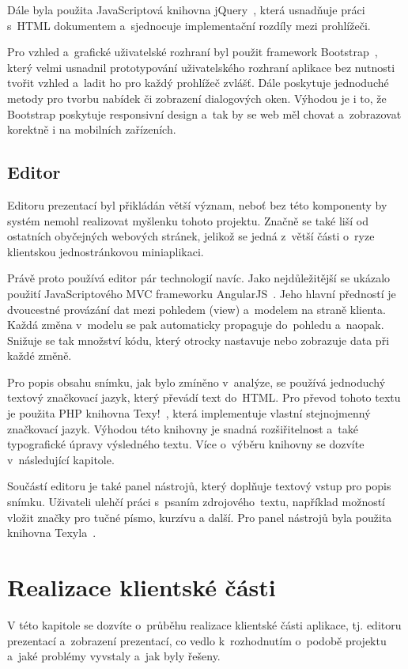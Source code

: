 \documentclass[11pt,twoside,a4paper]{book}
\newcommand*{\nom}[2]{#1\nomenclature{#1}{#2}} 			%
\begin{document}
Dále byla použita Java\-Scriptová knihovna jQuery~\cite{jQuery}, která usnadňuje práci s~HTML dokumentem a~sjednocuje imple\-mentační rozdíly mezi prohlížeči.

Pro vzhled a~grafické uživatelské rozhraní byl použit framework Bootstrap~\cite{bootstrap}, který velmi usnadnil prototypování uživatelského rozhraní aplikace bez nutnosti tvořit vzhled a~ladit ho pro každý prohlížeč zvlášť. Dále poskytuje jednoduché metody pro tvorbu nabídek či zobrazení dialogových oken. Výhodou je i to, že Bootstrap poskytuje responsivní design a~tak by se web měl chovat a~zobrazovat korektně i na mobilních zařízeních.


\section{Editor}
Editoru prezentací byl přikládán větší význam, neboť bez této komponenty by systém nemohl realizovat myšlenku tohoto projektu. Značně se také liší od ostatních obyčejných webových stránek, jelikož se jedná z~větší části o~ryze klientskou jednostránkovou mini\-aplikaci.

Právě proto používá editor pár technologií navíc. Jako nejdůležitější se ukázalo použití Java\-Scriptového \nom{MVC}{Model-View-Controller} frameworku AngularJS~\cite{angular}. Jeho hlavní předností je dvoucestné provázání dat mezi pohledem (view) a~modelem na straně klienta. Každá změna v~modelu se pak automaticky propaguje do~pohledu a~naopak. Snižuje se tak množství kódu, který otrocky nastavuje nebo zobrazuje data při každé změně. 

Pro popis obsahu snímku, jak bylo zmíněno v~analýze, se používá jednoduchý textový značkovací jazyk, který převádí text do~HTML. Pro převod tohoto textu je použita PHP knihovna Texy!~\cite{texy}, která imple\-mentuje vlastní stejnojmenný značkovací jazyk. Výhodou této knihovny je snadná rozšiřitelnost a~také typografické úpravy výsledného textu. Více o~výběru knihovny se dozvíte v~následující kapitole.

Součástí editoru je také panel nástrojů, který doplňuje textový vstup pro popis snímku. Uživateli ulehčí práci s~psaním zdrojového~textu, například možností vložit značky pro tučné písmo, kurzívu a další. Pro panel nástrojů byla použita knihovna Texyla~\cite{texyla}.



\chapter{Realizace klientské části} \label{chap:realizace}
V této kapitole se dozvíte o~průběhu realizace klientské části aplikace, tj. editoru prezentací a~zobrazení prezentací, co vedlo k~rozhodnutím o~podobě projektu a~jaké problémy vyvstaly a~jak byly řešeny.
\end{document}
